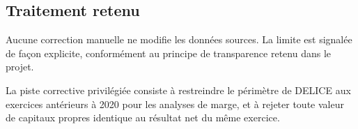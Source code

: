 \subsection{Traitement retenu}
Aucune correction manuelle ne modifie les données sources. La limite est
signalée de façon explicite, conformément au principe de transparence retenu
dans le projet.

La piste corrective privilégiée consiste à restreindre le périmètre de DELICE
aux exercices antérieurs à 2020 pour les analyses de marge, et à rejeter toute
valeur de capitaux propres identique au résultat net du même exercice.
